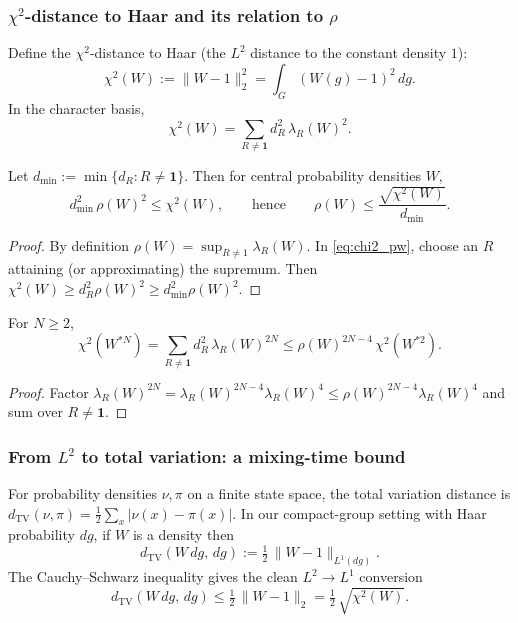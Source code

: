 \subsubsection{\texorpdfstring{$\chi^2$}{chi2}-distance to Haar and its relation to \texorpdfstring{$\rho$}{rho}}

Define the $\chi^2$-distance to Haar (the $L^2$ distance to the constant density $1$):
\[
\chi^2(W):=\|W-1\|_2^2 = \int_G (W(g)-1)^2\,dg.
\]
In the character basis,
\begin{equation}\label{eq:chi2_pw}
\chi^2(W)=\sum_{R\neq\mathbf 1} d_R^2\,\lambda_R(W)^2.
\end{equation}

\begin{lemma}\label{lem:rho_vs_chi2}
Let $d_{\min}:=\min\{d_R: R\neq \mathbf 1\}$.
Then for central probability densities $W$,
\[
d_{\min}^2\,\rho(W)^2 \le \chi^2(W),
\qquad\text{hence}\qquad
\rho(W)\le \frac{\sqrt{\chi^2(W)}}{d_{\min}}.
\]
\end{lemma}

\begin{proof}
By definition $\rho(W)=\sup_{R\neq 1}\lambda_R(W)$.
In \eqref{eq:chi2_pw}, choose an $R$ attaining (or approximating) the supremum.
Then $\chi^2(W)\ge d_R^2\rho(W)^2\ge d_{\min}^2\rho(W)^2$.
\end{proof}

\begin{proposition}\label{prop:chi2_convolution}
For $N\ge 2$,
\[
\chi^2(W^{*N})
=\sum_{R\neq\mathbf 1} d_R^2\,\lambda_R(W)^{2N}
\le \rho(W)^{2N-4}\,\chi^2(W^{*2}).
\]
\end{proposition}

\begin{proof}
Factor $\lambda_R(W)^{2N}=\lambda_R(W)^{2N-4}\lambda_R(W)^4\le \rho(W)^{2N-4}\lambda_R(W)^4$
and sum over $R\neq\mathbf 1$.
\end{proof}

\subsubsection{From \texorpdfstring{$L^2$}{L2} to total variation: a mixing-time bound}

For probability densities $\nu,\pi$ on a finite state space, the total variation distance is
$d_{\mathrm{TV}}(\nu,\pi)=\tfrac12\sum_x|\nu(x)-\pi(x)|$.
In our compact-group setting with Haar probability $dg$, if $W$ is a density then
\begin{equation}
 d_{\mathrm{TV}}(W\,dg,\,dg)
 := \tfrac12\,\|W-1\|_{L^1(dg)}.
\end{equation}
The Cauchy--Schwarz inequality gives the clean $L^2\to L^1$ conversion
\begin{equation}\label{eq:tv_vs_chi2_group}
 d_{\mathrm{TV}}(W\,dg,\,dg)
\le \tfrac12\,\|W-1\|_2
=\tfrac12\,\sqrt{\chi^2(W)}.
\end{equation}

